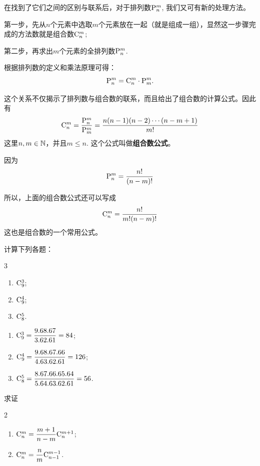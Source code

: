 在找到了它们之间的区别与联系后，对于排列数$\perm{n}{m}$, 我们又可有新的处理方法。

第一步，先从$n$个元素中选取$m$个元素放在一起（就是组成一组），显然这一步骤完成的方法数就是组合数$\comb{n}{m}$;

第二步，再求出$m$个元素的全排列数$\perm{n}{m}$.

根据排列数的定义和乘法原理可得：
\[
\perm{n}{m}=\comb{n}{m}\cdot \perm{m}{m}.\]

这个关系不仅揭示了排列数与组合数的联系，而且给出了组合数的计算公式。因此有
\[\comb{n}{m}=\frac{\perm{n}{m}}{\perm{m}{m}}=\frac{n(n-1)(n-2)\cdots(n-m+1)}{m!}\]
这里$n, m\in \N$，并且$m\le  n$. 这个公式叫做\textbf{组合数公式}。

因为
\[\perm{n}{m}=\frac{n!}{(n-m)!}\]

所以，上面的组合数公式还可以写成
\[\comb{n}{m}=\frac{n!}{m!(n-m)!}\]
这也是组合数的一个常用公式。

\begin{example}
    计算下列各题：
\begin{multicols}{3}
\begin{enumerate}[(1)]
    \item $\comb{9}{3}$;
    \item $\comb{9}{4}$;
    \item $\comb{8}{5}$.
\end{enumerate}    
\end{multicols}
\end{example}


\begin{solution}
\begin{enumerate}[(1)]
    \item $\comb{9}{3}=\frac{9\x  8\x  7}{3\x  2\x  1}=84$;
    \item $\comb{9}{4}=\frac{9\x  8\x  7\x  6}{4\x  3\x  2\x  1}=126$;
    \item $\comb{8}{5}=\frac{8\x  7\x  6\x  5\x  4}{5\x  4\x  3\x  2\x  1}=56$.
\end{enumerate}
\end{solution}

\begin{example}
    求证
\begin{multicols}{2}
\begin{enumerate}[(1)]
    \item $\comb{n}{m}=\frac{m+1}{n-m}\comb{n}{m+1}$;
    \item $\comb{n}{m}=\frac{n}{m}\comb{n-1}{m-1}$.
\end{enumerate}
\end{multicols}
\end{example}

